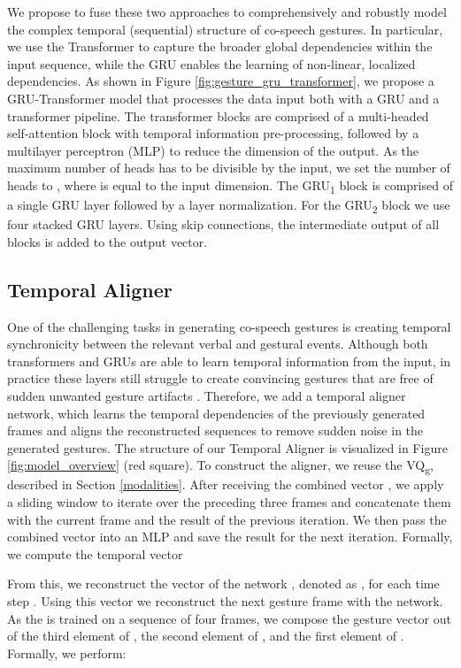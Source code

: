 \documentclass[sigconf]{acmart}
\begin{document}
We propose to fuse these two approaches to comprehensively and robustly model the complex temporal (sequential) structure of co-speech gestures. In particular, we use the Transformer to capture the broader global dependencies within the input sequence, while the GRU enables the learning of non-linear, localized dependencies.
As shown in Figure \ref{fig:gesture_gru_transformer}, we propose a GRU-Transformer model that processes the data input both with a GRU and a transformer pipeline. The transformer blocks are comprised of a multi-headed self-attention block with temporal information pre-processing, followed by a multilayer perceptron (MLP) to reduce the dimension of the output. As the maximum number of heads has to be divisible by the input, we set the number of heads to , where  is equal to the input dimension. 
The GRU\textsubscript{1} block is comprised of a single GRU layer followed by a layer normalization. For the GRU\textsubscript{2} block we use four stacked GRU layers.
Using skip connections, the intermediate output of all blocks is added to the output vector.


\subsection{Temporal Aligner}
One of the challenging tasks in generating co-speech gestures is creating temporal synchronicity between the relevant verbal and gestural events. Although both transformers and GRUs are able to learn temporal information from the input, in practice these layers still struggle to create convincing gestures that are free of sudden unwanted gesture artifacts \cite{liuLearningHierarchicalCrossModal2022a,fan2020addressing}. Therefore, we add a temporal aligner network, which learns the temporal dependencies of the previously generated frames and aligns the reconstructed sequences to remove sudden noise in the generated gestures. The structure of our Temporal Aligner is visualized in Figure \ref{fig:model_overview} (red square). To construct the aligner, we reuse the VQ\textsubscript{g}, described in Section \ref{modalities}. After receiving the combined vector , we apply a sliding window to iterate over the preceding three frames and concatenate them with the current frame and the result of the previous iteration. We then pass the combined vector into an MLP and save the result for the next iteration. Formally, we compute the temporal vector

From this, we reconstruct the vector  of the network , denoted as , for each time step . Using this vector  we reconstruct the next gesture frame  with the  network. As the  is trained on a sequence of four frames, we compose the gesture vector  out of the 
third element of , the second element of , and the first element of . Formally, we perform:
\end{document}
